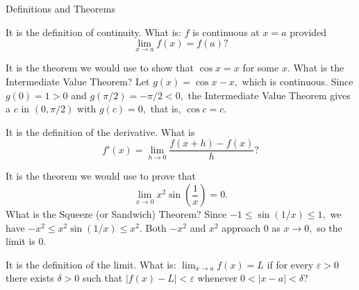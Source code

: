 \documentclass{article}
\begin{document}
\begin{category}{Definitions and Theorems}

  \begin{clue}[write]
    It is the definition of continuity.
  \response
    What is: $f$ is continuous at $x = a$ provided
    \[ \lim_{x\to a} f(x) = f(a)? \]
  \end{clue}

  \begin{clue}[say]
    It is the theorem we would use to show that $\cos x = x$ for some $x.$
  \response
    What is the Intermediate Value Theorem?
  \solution
    Let $g(x) = \cos x - x,$ which is continuous. Since $g(0) = 1 > 0$ and
    $g(\pi/2) = -\pi/2 < 0,$ the Intermediate Value Theorem gives a $c$ in
    $(0, \pi/2)$ with $g(c) = 0,$ that is, $\cos c = c.$
  \end{clue}

  \begin{clue}[write]
    It is the definition of the derivative.
  \response
    What is
    \[ f'(x) = \lim_{h\to 0} \frac{f(x+h) - f(x)}{h}? \]
  \end{clue}

  \begin{clue}[say]
    It is the theorem we would use to prove that
    \[ \lim_{x\to 0} x^2 \sin\left(\frac{1}{x}\right) = 0. \]
  \response
    What is the Squeeze (or Sandwich) Theorem?
  \solution
    Since $-1 \le \sin(1/x) \le 1,$ we have
    $-x^2 \le x^2 \sin(1/x) \le x^2.$ Both $-x^2$ and $x^2$ approach $0$ as
    $x \to 0,$ so the limit is $0.$
  \end{clue}

  \begin{clue}[write]
    It is the definition of the limit.
  \response
    What is: $\displaystyle\lim_{x\to a} f(x) = L$ if for every
    $\varepsilon > 0$ there exists $\delta > 0$ such that
    $|f(x) - L| < \varepsilon$ whenever $0 < |x - a| < \delta$?
  \end{clue}

\end{category}
\end{document}
